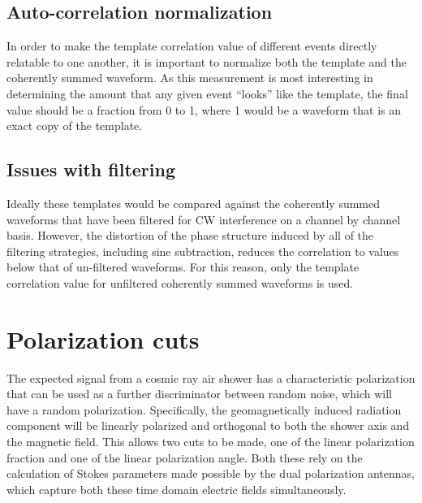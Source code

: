 		
	
	\subsection{Auto-correlation normalization}
		In order to make the template correlation value of different events directly relatable to one another, it is important to normalize both the template and the coherently summed waveform.  As this measurement is most interesting in determining the amount that any given event ``looks'' like the template, the final value should be a fraction from 0 to 1, where 1 would be a waveform that is an exact copy of the template.

	\subsection{Issues with filtering}
		Ideally these templates would be compared against the coherently summed waveforms that have been filtered for CW interference on a channel by channel basis.  However, the distortion of the phase structure induced by all of the filtering strategies, including sine subtraction, reduces the correlation to values below that of un-filtered waveforms.  For this reason, only the template correlation value for unfiltered coherently summed waveforms is used.

\section{Polarization cuts}%
	The expected signal from a cosmic ray air shower has a characteristic polarization that can be used as a further discriminator between random noise, which will have a random polarization.  Specifically, the geomagnetically induced radiation component will be linearly polarized and orthogonal to both the shower axis and the magnetic field.  This allows two cuts to be made, one of the linear polarization fraction and one of the linear polarization angle.  Both these rely on the calculation of Stokes parameters made possible by the dual polarization antennas, which capture both these time domain electric fields simultaneously.

